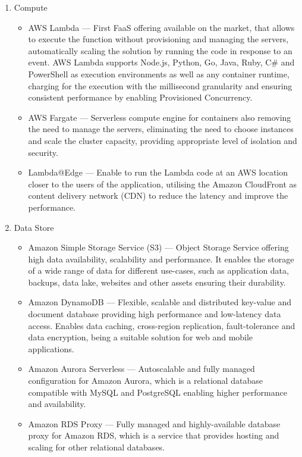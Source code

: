 \begin{enumerate}
   \item Compute
   \begin{itemize}
       \item AWS Lambda --- First FaaS offering available on the market, that allows to execute the function without provisioning and managing the servers, automatically scaling the solution by running the code in response to an event. AWS Lambda supports Node.js, Python, Go, Java, Ruby, C\# and PowerShell as execution environments as well as any container runtime, charging for the execution with the millisecond granularity and ensuring consistent performance by enabling Provisioned Concurrency.
       \item AWS Fargate --- Serverless compute engine for containers also removing the need to manage the servers, eliminating the need to choose instances and scale the cluster capacity, providing appropriate level of isolation and security.
       \item Lambda@Edge --- Enable to run the Lambda code at an AWS location closer to the users of the application, utilising the Amazon CloudFront as content delivery network (CDN) to reduce the latency and improve the performance.
   \end{itemize}
   \item Data Store
   \begin{itemize}
       \item Amazon Simple Storage Service (S3) --- Object Storage Service offering high data availability, scalability and performance. It enables the storage of a wide range of data for different use-cases, such as application data, backups, data lake, websites and other assets ensuring their durability.
       \item Amazon DynamoDB --- Flexible, scalable and distributed key-value and document database providing high performance and low-latency data access. Enables data caching, cross-region replication, fault-tolerance and data encryption, being a suitable solution for web and mobile applications.
       \item Amazon Aurora Serverless --- Autoscalable and fully managed configuration for Amazon Aurora, which is a relational database compatible with MySQL and PostgreSQL enabling higher performance and availability.
       \item Amazon RDS Proxy --- Fully managed and highly-available database proxy for Amazon RDS, which is a service that provides hosting and scaling for other relational databases.

\end{itemize}
\end{enumerate}
